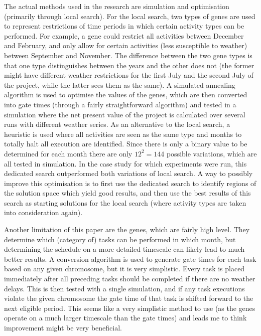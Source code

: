 \documentclass[a4paper,12pt]{article}
\begin{document}
The actual methods used in the research are simulation and optimisation (primarily through local search). For the local search, two types of genes are used to represent restrictions of time periods in which certain activity types can be performed. For example, a gene could restrict all activities between December and February, and only allow for certain activities (less susceptible to weather) between September and November. The difference between the two gene types is that one type distinguishes between the years and the other does not (the former might have different weather restrictions for the first July and the second July of the project, while the latter sees them as the same). A simulated annealing algorithm is used to optimise the values of the genes, which are then converted into gate times (through a fairly straightforward algorithm) and tested in a simulation where the net present value of the project is calculated over several runs with different weather series. As an alternative to the local search, a heuristic is used where all activities are seen as the same type and months to totally halt all execution are identified. Since there is only a binary value to be determined for each month there are only $12^2 = 144$ possible variations, which are all tested in simulation. In the case study for which experiments were run, this dedicated search outperformed both variations of local search. A way to possibly improve this optimisation is to first use the dedicated search to identify regions of the solution space which yield good results, and then use the best results of this search as starting solutions for the local search (where activity types are taken into consideration again). 

Another limitation of this paper are the genes, which are fairly high level. They determine which (category of) tasks can be performed in which month, but determining the schedule on a more detailed timescale can likely lead to much better results. A conversion algorithm is used to generate gate times for each task based on any given chromosome, but it is very simplistic. Every task is placed immediately after all preceding tasks should be completed if there are no weather delays. This is then tested with a single simulation, and if any task executions violate the given chromosome the gate time of that task is shifted forward to the next eligible period. This seems like a very simplistic method to use (as the genes operate on a much larger timescale than the gate times) and leads me to think improvement might be very beneficial.
\end{document}
